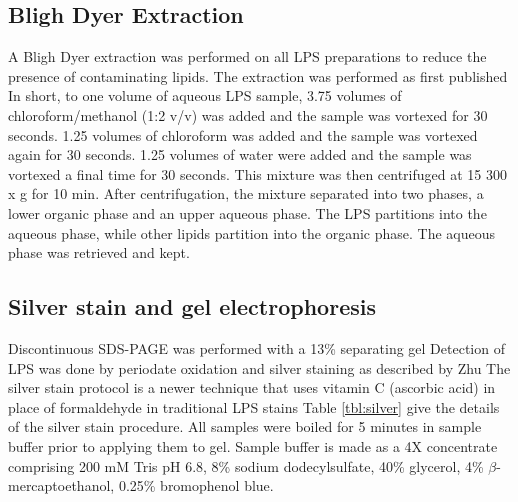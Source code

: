 	\subsection{Bligh Dyer Extraction} %
	\label{sub:bligh_dyer_extraction}
  A Bligh Dyer extraction was performed on all \ac{LPS} preparations to reduce the presence of
  contaminating lipids. The extraction was performed as first published In
  short, to one volume of aqueous \ac{LPS} sample, 3.75 volumes of chloroform/methanol (1:2 v/v) was
  added and the sample was vortexed for 30 seconds. 1.25 volumes of chloroform was added and the
  sample was vortexed again for 30 seconds. 1.25 volumes of water were added and the sample was
  vortexed a final time for 30 seconds. This mixture was then centrifuged at 15 300 x g for 10
  min. After centrifugation, the mixture separated into two phases, a lower organic phase and an
  upper aqueous phase. The \ac{LPS} partitions into the aqueous phase, while other lipids partition
  into the organic phase. The aqueous phase was retrieved and kept.

	\subsection{Silver stain and gel electrophoresis} %
	\label{sub:gel_electrophoresis}

  Discontinuous \ac{SDS-PAGE} was performed with a 13\% separating gel Detection
  of \ac{LPS} was done by periodate oxidation and silver staining as described by Zhu
  \etal\! The silver stain protocol is a newer technique that uses
  vitamin C (ascorbic acid) in place of formaldehyde in traditional \ac{LPS}
  stains Table \ref{tbl:silver} give the details of the silver stain
  procedure.%
All samples were boiled for 5 minutes in sample buffer prior to applying them to gel. Sample buffer is made as a 4X concentrate comprising 200 mM Tris pH 6.8, 8\% sodium dodecylsulfate, 40\% glycerol, 4\% $\beta$-mercaptoethanol, 0.25\% bromophenol blue.


